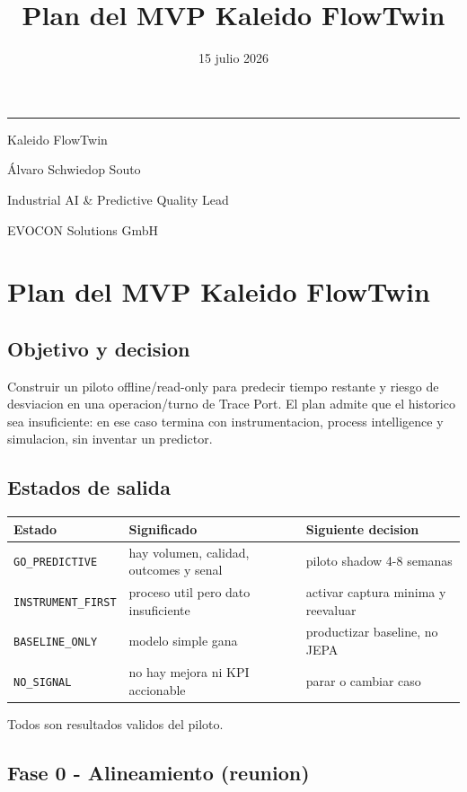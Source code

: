 \documentclass[
  spanish,
  10pt,
  a4paper,
]{article}
\title{Plan del MVP Kaleido FlowTwin}
\author{}
\date{15 julio 2026}
\makeatletter
\newcounter{none} %
\renewcommand{\maketitle}{%
  \hypersetup{pageanchor=false}
  \begin{titlepage}
    \pagecolor{KaleidoNavy}
    \color{white}
    \vspace*{1.4cm}
    {\color{KaleidoCyan}\rule{2.4cm}{2.5pt}\par}
    \vspace{1.1cm}
    {\Huge\bfseries\@title\par}
    \vspace{0.65cm}
    {\Large\color{KaleidoMint}Kaleido FlowTwin\par}
    \vfill
    {\large Álvaro Schwiedop Souto\par}
    \vspace{0.15cm}
    {\normalsize\color{KaleidoMint}Industrial AI \& Predictive Quality Lead\par}
    \vspace{0.15cm}
    {\normalsize\color{KaleidoMint}EVOCON Solutions GmbH\par}
    \vspace{0.25cm}
    {\normalsize\color{KaleidoMint}\@date\par}
  \end{titlepage}
  \hypersetup{pageanchor=true}
  \nopagecolor
  \color{black}
}
\makeatother
\begin{document}
\maketitle

{
\setcounter{tocdepth}{3}
\tableofcontents
}
\section{Plan del MVP Kaleido
FlowTwin}\label{plan-del-mvp-kaleido-flowtwin}

\subsection{Objetivo y decision}\label{objetivo-y-decision}

Construir un piloto offline/read-only para predecir tiempo restante y
riesgo de desviacion en una operacion/turno de Trace Port. El plan
admite que el historico sea insuficiente: en ese caso termina con
instrumentacion, process intelligence y simulacion, sin inventar un
predictor.

\subsection{Estados de salida}\label{estados-de-salida}

{\def\LTcaptype{none} %
\begin{longtable}[]{@{}lll@{}}
\toprule\noalign{}
Estado & Significado & Siguiente decision \\
\midrule\noalign{}
\endhead
\bottomrule\noalign{}
\endlastfoot
\texttt{GO\_PREDICTIVE} & hay volumen, calidad, outcomes y senal &
piloto shadow 4-8 semanas \\
\texttt{INSTRUMENT\_FIRST} & proceso util pero dato insuficiente &
activar captura minima y reevaluar \\
\texttt{BASELINE\_ONLY} & modelo simple gana & productizar baseline, no
JEPA \\
\texttt{NO\_SIGNAL} & no hay mejora ni KPI accionable & parar o cambiar
caso \\
\end{longtable}
}

Todos son resultados validos del piloto.

\subsection{Fase 0 - Alineamiento
(reunion)}\label{fase-0---alineamiento-reunion}
\end{document}
